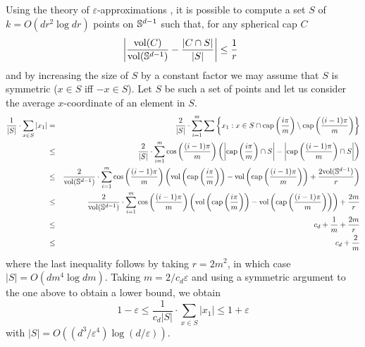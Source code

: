 \documentclass[charterfonts,lotsofwhite]{patmorin}
\newcommand{\eps}{\varepsilon}
\begin{document}
Using the theory of $\eps$-approximations \cite[Chapter~4]{c00}, it is
possible to compute a set $S$ of $k=O(dr^2\log dr)$ points on $\mathbb{S}^{d-1}$ such
that, for any spherical cap $C$
\[
    \left|\frac{\mathrm{vol}(C)}{\mathrm{vol}(\mathbb{S}^{d-1})} - \frac{|C\cap S|}{|S|} \right| 
              \le \frac{1}{r}  \enspace 
\]
and by increasing the size of $S$ by a constant factor we may assume
that $S$ is symmetric ($x\in S$ iff $-x\in S$).
Let $S$ be such a set of points and let us consider the average
$x$-coordinate of an element in $S$.
\begin{eqnarray*}
\frac{1}{|S|}\cdot \sum_{x\in S} |x_1|
  & = & \frac{2}{|S|}\cdot\sum_{i=1}^m
          \sum\left\{x_1: x\in
              S\cap\mathrm{cap}\left(\frac{i\pi}{m}\right) 
                \setminus\mathrm{cap}\left(\frac{(i-1)\pi}{m}\right)
          \right\} \\
  & \le & \frac{2}{|S|}\cdot
         \sum_{i=1}^m\cos\left(\frac{(i-1)\pi}{m}\right)
           \left(
             \left|\mathrm{cap}\left(\frac{i\pi}{m}\right)\cap S\right| -
             \left|\mathrm{cap}\left(\frac{(i-1)\pi}{m}\right)\cap S\right|
           \right) \\
  & \le & \frac{2}{\mathrm{vol}(\mathbb{S}^{d-1})}\cdot
         \sum_{i=1}^m\cos\left(\frac{(i-1)\pi}{m}\right)
           \left(
             \mathrm{vol}\left(\mathrm{cap}\left(\frac{i\pi}{m}\right)\right) -
             \mathrm{vol}\left(\mathrm{cap}\left(\frac{(i-1)\pi}{m}\right)\right) +
             \frac{2\mathrm{vol}(\mathbb{S}^{d-1})}{r}
           \right) \\
  & \le & \frac{2}{\mathrm{vol}(\mathbb{S}^{d-1})}\cdot
         \sum_{i=1}^m\cos\left(\frac{(i-1)\pi}{m}\right)
           \left(
             \mathrm{vol}\left(\mathrm{cap}\left(\frac{i\pi}{m}\right)\right) -
             \mathrm{vol}\left(\mathrm{cap}\left(\frac{(i-1)\pi}{m}\right)\right)
           \right) + \frac{2m}{r} \\
  & \le & c_d + \frac{1}{m} + \frac{2m}{r} \\
  & \le & c_d + \frac{2}{m} 
\end{eqnarray*}
where the last inequality follows by taking $r=2m^2$, in which case
$|S|=O(dm^4\log dm)$.  Taking $m=2/c_d\eps$ and using a symmetric
argument to the one above to obtain a lower bound, we obtain
\[
  1-\eps \le \frac{1}{c_d|S|}\cdot\sum_{x\in S}|x_1| \le 1 + \eps
\]
with $|S|=O((d^3/\eps^4)\log(d/\eps))$.  
\end{document}
